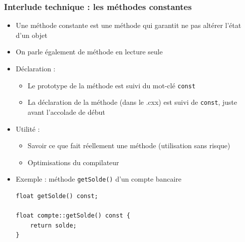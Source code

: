 \begin{frame}[fragile]\frametitle{Interlude technique : les méthodes constantes}
\begin{itemize}
\item Une méthode constante est une méthode qui garantit ne pas altérer l'état d'un objet
\item On parle également de méthode en lecture seule
\item Déclaration :
\begin{itemize}
\item Le prototype de la méthode est suivi du mot-clé \texttt{const}
\item La déclaration de la méthode (dans le .cxx) est suivi de \texttt{const}, juste avant l'accolade de début
\end{itemize}
\item Utilité :
\begin{itemize}
\item Savoir ce que fait réellement une méthode (utilisation sans risque)
\item Optimisations du compilateur
\end{itemize}
\item Exemple : méthode \texttt{getSolde()} d'un compte bancaire
\begin{lstlisting}
float getSolde() const;

float compte::getSolde() const {
    return solde;
}
\end{lstlisting}
\end{itemize}
\end{frame}



